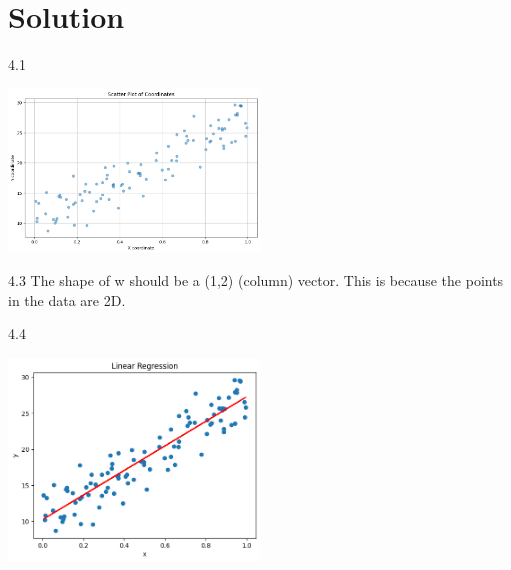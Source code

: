 \documentclass{../harvardml}
\theoremstyle{definition}
\theoremstyle{plain}
\newenvironment{solution}
  {\color{blue}\section*{Solution}}
{}
\begin{document}
\begin{solution}
    4.1
    \begin{center}
        \includegraphics[width=0.5\textwidth]{images/4.1.png}
        \end{center}


	
     4.3 The shape of w should be a (1,2) (column) vector. This is because the points in the data are 2D.


    4.4 
    \begin{center}
        \includegraphics[width=0.5\textwidth]{images/4.4.png}
        \end{center}

        
\end{solution}
\end{document}
